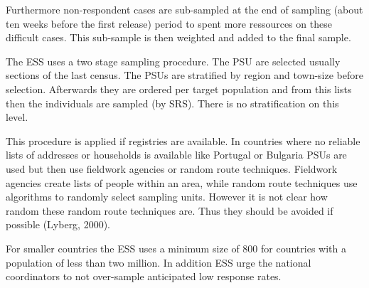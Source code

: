 Furthermore non-respondent cases are sub-sampled at the end of sampling (about ten weeks before the first release) period to spent more ressources on these difficult cases. This sub-sample is then weighted and added to the final sample.
\begin{table}[H]
\centering
{}
	\caption{Comparison of ESS and GSS}
	\label{ESScomp}
\end{table}

The ESS uses a two stage sampling procedure. The PSU are selected usually sections of the last census. The PSUs are stratified by region and town-size before selection. Afterwards they are ordered per target population and from this lists then the individuals are sampled (by SRS). There is no stratification on this level. 

This procedure is applied if registries are available. In countries where no reliable lists of addresses or households is available like Portugal or Bulgaria PSUs are used but then use fieldwork agencies or random route techniques. Fieldwork agencies create lists of people within an area, while random route techniques use algorithms to randomly select sampling units. However it is not clear how random these random route techniques are. Thus they should be avoided if possible (Lyberg, 2000).

For smaller countries the ESS uses a minimum size of 800 for countries with a population of less than two million. In addition ESS urge the national coordinators to not over-sample anticipated low response rates.
